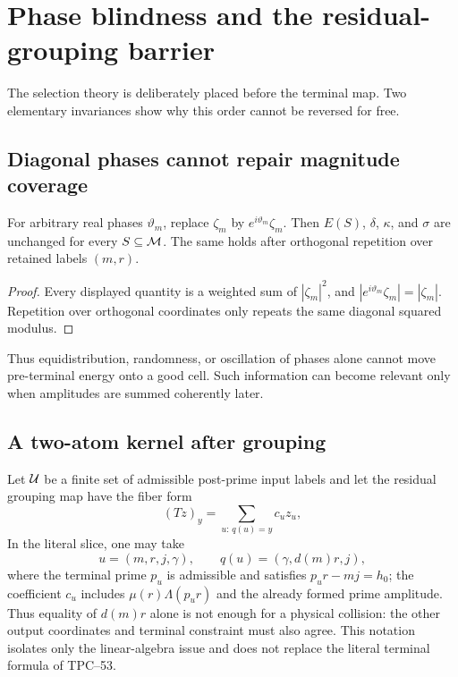 \section{Phase blindness and the residual-grouping barrier}
\label{sec:grouping}

The selection theory is deliberately placed before the terminal map.  Two
elementary invariances show why this order cannot be reversed for free.

\subsection{Diagonal phases cannot repair magnitude coverage}

\begin{proposition}
\label{prop:tpc54-phase-blindness}
For arbitrary real phases \(\vartheta_m\), replace
\(\zeta_m\) by \(e^{i\vartheta_m}\zeta_m\).  Then
\(E(S)\), \(\delta\), \(\kappa\), and \(\sigma\) are unchanged for every
\(S\subseteq\mathcal M\).  The same holds after orthogonal repetition over
retained labels \((m,r)\).
\end{proposition}

\begin{proof}
Every displayed quantity is a weighted sum of \(|\zeta_m|^2\), and
\(|e^{i\vartheta_m}\zeta_m|=|\zeta_m|\).  Repetition over orthogonal
coordinates only repeats the same diagonal squared modulus.
\end{proof}

Thus equidistribution, randomness, or oscillation of phases alone cannot
move pre-terminal energy onto a good cell.  Such information can become
relevant only when amplitudes are summed coherently later.

\subsection{A two-atom kernel after grouping}

Let \(\mathcal U\) be a finite set of admissible post-prime input labels and let
the residual grouping map have the fiber form
\begin{equation}
 (Tz)_y=\sum_{u:\,q(u)=y}c_u z_u,
 \label{eq:tpc54-fiber-map}
\end{equation}
In the literal slice, one may take
\[
 u=(m,r,j,\gamma),\qquad
 q(u)=(\gamma,d(m)r,j),
\]
where the terminal prime \(p_u\) is admissible and satisfies
\(p_ur-mj=h_0\); the coefficient \(c_u\) includes
\(\mu(r)\Lambda(p_ur)\) and the already formed prime amplitude.  Thus
equality of \(d(m)r\) alone is not enough for a physical collision: the
other output coordinates and terminal constraint must also agree.  This
notation isolates only the linear-algebra issue and does not replace the
literal terminal formula of TPC--53.

